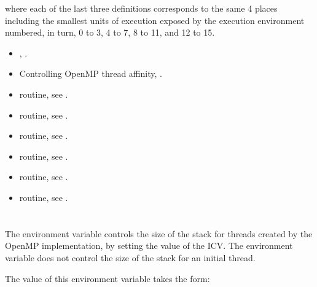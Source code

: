 where each of the last three definitions corresponds to the same 4 places including the
smallest units of execution exposed by the execution environment numbered, in turn, 0
to 3, 4 to 7, 8 to 11, and 12 to 15.

\crossreferences
\begin{itemize}
\item {}, .

\item Controlling OpenMP thread affinity, .

\item {} routine, see .

\item {} routine, see .

\item {} routine, see .

\item {} routine, see .

\item {} routine, see .

\item {} routine, see .
\end{itemize}










\section{}
\label{sec:OMP_STACKSIZE}
The  environment variable controls the size of the stack for threads
created by the OpenMP implementation, by setting the value of the  ICV.
The environment variable does not control the size of the stack for an initial thread.

The value of this environment variable takes the form:

